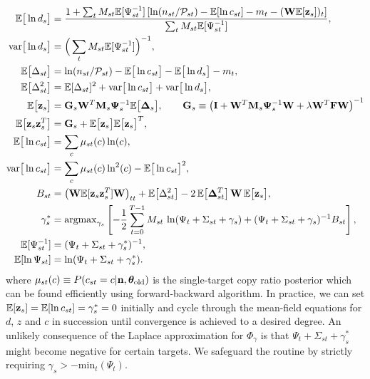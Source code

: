 \documentclass[nofootinbib,amssymb,amsmath]{revtex4}
\newcommand{\vI}{{\bf I}}
\newcommand{\vz}{{\bf z}}
\newcommand{\vn}{{\bf n}}
\newcommand{\vG}{{\bf G}}
\newcommand{\vM}{{\bf M}}
\newcommand{\vW}{{\bf W}}
\newcommand{\vF}{{\bf F}}
\newcommand{\vPsi}{{\bf \Psi}}
\newcommand{\vDelta}{{\bf \Delta}}
\newcommand{\vtheta}{{\boldsymbol \theta}}
\newcommand{\PP}{\mathcal{P}}
\newcommand{\EE}{\mathbb{E}}
\begin{document}
\begin{subequations}
\begin{align}
\EE\big[\ln d_s \big] &= \frac{1 + \sum_t M_{st} \EE[\Psi_{st}^{-1}]\left[\ln(n_{st}/\PP_{st}) - \EE[\ln c_{st}] - m_t - (\vW \EE[\vz_s])_t\right]}{\sum_t M_{st} \EE[\Psi_{st}^{-1}]},\\
\mathrm{var}\big[\ln d_s\big] &= \Big(\sum_t M_{st} \EE[\Psi_{st}^{-1}]\Big)^{-1},\\
\EE\big[\Delta_{st}\big] &= \ln(n_{st}/\PP_{st}) - \EE\big[\ln c_{st}\big] - \EE\big[\ln d_s\big] - m_t,\\
\EE\big[\Delta_{st}^2\big] &= \EE[\Delta_{st}]^2 + \mathrm{var}\big[\ln c_{st}\big] + \mathrm{var}\big[\ln d_{s}\big],\\
\EE\big[\vz_s\big] &= \vG_s \vW^T \vM_s \vPsi_s^{-1} \EE\big[\mathbf{\Delta}_s\big],\qquad \vG_s \equiv \left( \vI + \vW^T \vM_s \vPsi_s^{-1} \vW + \lambda \vW^T \vF \vW \right)^{-1}\\
\EE\big[\vz_s \vz_s^T \big] &= \vG_s + \EE\big[\vz_s\big] \EE\big[\vz_s\big]^T,\\
\EE\big[\ln c_{st}\big] &= \sum_{c} \mu_{st}(c) \ln(c),\\
\mathrm{var}\big[\ln c_{st}\big] &= \sum_{c} \mu_{st}(c) \ln^2(c) - \EE\big[\ln c_{st}\big]^2,\\
B_{st} &= \big(\vW \EE[\vz_s \vz_s^T] \vW\big)_{tt} + \EE\big[\Delta_{st}^2\big] - 2 \, \EE\big[\vDelta_{st}^T\big] \, \vW \, \EE\big[\vz_s\big],\\
\gamma^*_s &= \mathrm{argmax}_{\gamma_s}\left[-\frac{1}{2}\sum_{t=0}^{T-1} M_{st} \, \ln(\Psi_t + \Sigma_{st} + \gamma_s) + (\Psi_t + \Sigma_{st} + \gamma_s)^{-1} B_{st} \right],\\
\EE[\Psi_{st}^{-1}] &= (\Psi_{t} + \Sigma_{st} + \gamma_s^*)^{-1},\\
\EE[\ln \Psi_{st}] &= \ln(\Psi_t + \Sigma_{st} + \gamma_s^*).
\end{align}
\end{subequations}
where $\mu_{st}(c) \equiv P(c_{st} = c | \vn, \vtheta_\mathrm{old})$ is the single-target copy ratio posterior which can be found efficiently using forward-backward algorithm. In practice, we can set $\EE[\vz_s] = \EE[\ln c_{st}] = \gamma_s^* = 0$ initially and cycle through the mean-field equations for $d$, $z$ and $c$ in succession until convergence is achieved to a desired degree. An unlikely consequence of the Laplace approximation for $\Phi_\gamma$ is that $\Psi_{t} + \Sigma_{st} + \gamma_s^*$ might become negative for certain targets. We safeguard the routine by strictly requiring $\gamma_s > - \mathrm{min}_t(\Psi_{t})$.
\end{document}
